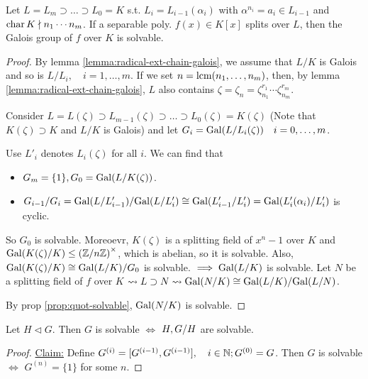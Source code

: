 \begin{theorem}[Part A]
  Let $L = L_m \supset \dots \supset L_0 = K$ s.t. $L_i = L_{i-1}(\alpha_i)$
  with $\alpha^{n_i} = a_i \in L_{i-1}$ and $\operatorname{char} K \nmid n_1\cdots n_m$.
  If a separable poly. $f(x) \in K[x]$ splits over $L$, then the Galois group
  of $f$ over $K$ is solvable.
  
  \begin{proof}
    By lemma \ref{lemma:radical-ext-chain-galois}, we assume that $L/K$ is
    Galois and so is $L/L_i, \quad i=1,\dots,m$.
    If we set $n = \operatorname{lcm}(n_1, \dots, n_m)$, then, by lemma \ref{lemma:radical-ext-chain-galois},
    $L$ also contains $\zeta = \zeta_n = \zeta_{n_1}^{r_1} \cdots \zeta_{n_m}^{r_m}$.

    Consider $L = L(\zeta) \supset L_{m-1}(\zeta) \supset \dots \supset
    L_0(\zeta) = K(\zeta)$ (Note that $K(\zeta) \supset K$ and $L/K$ is Galois)
    and let $G_i = \operatorname{Gal}(L/L_i(\zeta)) \quad i = 0, \dots, m$.

    Use $L'_i$ denotes $L_i(\zeta)$ for all $i$. We can find that
    \begin{itemize}
      \item $G_m = \{1\}, G_0 = \operatorname{Gal}(L/K(\zeta))$.
      \item ${G_{i-1}}/{G_i} = {\operatorname{Gal}(L/L'_{i-1})}/{\operatorname{Gal}(L/L'_i)}
        \cong \operatorname{Gal}(L'_{i-1} / L'_i) =  \operatorname{Gal}(L'_i(\alpha_i) / L'_i)$ is cyclic.
    \end{itemize}
    So $G_0$ is solvable.
    Moreoevr, $K(\zeta)$ is a splitting field of $x^n - 1$ over $K$ and
    $\operatorname{Gal}(K(\zeta)/K) \le \left({\mathbb{Z}}/{n\mathbb{Z}}\right)^\times$, which is
    abelian, so it is solvable. Also, $\operatorname{Gal}(K(\zeta)/K) \cong {\operatorname{Gal}(L/K)}/{G_0}$
    is solvable. $\implies \operatorname{Gal}(L/K)$ is solvable.
    Let $N$ be a splitting field of $f$ over $K$ $\leadsto L \supset N \leadsto
    \operatorname{Gal}(N/K) \cong {\operatorname{Gal}(L/K)}/{\operatorname{Gal}(L/N)}$.

    By prop \ref{prop:quot-solvable}, $\operatorname{Gal}(N/K)$ is solvable.
  \end{proof}
\end{theorem}

\begin{prop} \label{prop:quot-solvable}
  Let $H \lhd G$. Then $G$ is solvable $\iff$ $H, {G}/{H}$ are solvable.

  \begin{proof}
    \underline{Claim:} Define $G^{(i)} = [G^{(i-1)}, G^{(i-1)}], \quad
    i \in \mathbb{N}; G^{(0)} = G$.
    Then $G$ is solvable $\iff$ $G^{(n)} = \{1 \}$ for some $n$.
  \end{proof}
\end{prop}

